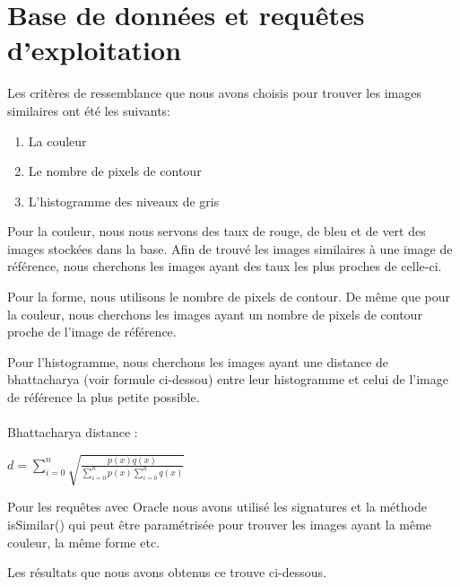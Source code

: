 \section{Base de données et requêtes d'exploitation}

Les critères de ressemblance que nous avons choisis pour trouver les images similaires ont été les suivants:
\begin{enumerate}
\item La couleur
\item Le nombre de pixels de contour
\item L'histogramme des niveaux de gris
\end{enumerate} 

Pour la couleur, nous nous servons des taux de rouge, de bleu et de vert des images stockées dans la base. Afin de trouvé les images similaires à une image de référence, nous cherchons les images ayant des taux les plus proches de celle-ci.

Pour la forme, nous utilisons le nombre de pixels de contour. De même que pour la couleur, nous cherchons les images ayant un nombre de pixels de contour proche de l'image de référence.

Pour l'histogramme, nous cherchons les images ayant une distance de bhattacharya (voir formule ci-dessou)  entre leur histogramme et celui de l'image de référence la plus petite possible.

\paragraph{}Bhattacharya distance :
\begin{center} 
$d = \sum\limits_{i=0}^n\sqrt{\frac{p(x)q(x)}{\sum\limits_{i=0}^n p(x)\sum\limits_{i=0}^n q(x)} }$ 
\end{center} 

Pour les requêtes avec Oracle nous avons utilisé les signatures et la méthode isSimilar() qui peut être paramétrisée pour trouver les images ayant la même couleur, la même forme etc.

Les résultats que nous avons obtenus ce trouve ci-dessous.


